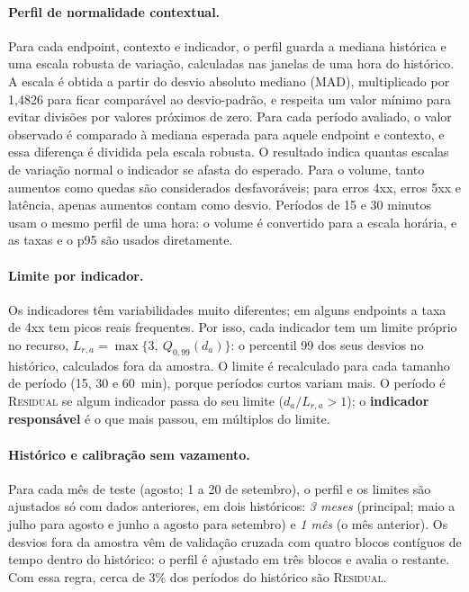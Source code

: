 \documentclass[sigconf,nonacm]{acmart}
\newcommand{\Residual}{\textsc{Residual}\xspace}
\begin{document}
\paragraph{Perfil de normalidade contextual.} Para cada endpoint, contexto e indicador, o perfil guarda a mediana histórica e uma escala robusta de variação, calculadas nas janelas de uma hora do histórico. A escala é obtida a partir do desvio absoluto mediano (MAD), multiplicado por 1,4826 para ficar comparável ao desvio-padrão, e respeita um valor mínimo para evitar divisões por valores próximos de zero. Para cada período avaliado, o valor observado é comparado à mediana esperada para aquele endpoint e contexto, e essa diferença é dividida pela escala robusta. O resultado indica quantas escalas de variação normal o indicador se afasta do esperado. Para o volume, tanto aumentos como quedas são considerados desfavoráveis; para erros 4xx, erros 5xx e latência, apenas aumentos contam como desvio. Períodos de 15 e 30 minutos usam o mesmo perfil de uma hora: o volume é convertido para a escala horária, e as taxas e o p95 são usados diretamente.

\paragraph{Limite por indicador.} Os indicadores têm variabilidades muito diferentes; em alguns endpoints a taxa de 4xx tem picos reais frequentes. Por isso, cada indicador tem um limite próprio no recurso, $L_{r,a}=\max\{3,\ Q_{0{,}99}(d_a)\}$: o percentil 99 dos seus desvios no histórico, calculados fora da amostra. O limite é recalculado para cada tamanho de período (15, 30 e 60~min), porque períodos curtos variam mais. O período é \Residual se algum indicador passa do seu limite ($d_a/L_{r,a}>1$); o \textbf{indicador responsável} é o que mais passou, em múltiplos do limite.

\paragraph{Histórico e calibração sem vazamento.} Para cada mês de teste (agosto; 1 a 20 de setembro), o perfil e os limites são ajustados só com dados anteriores, em dois históricos: \emph{3 meses} (principal; maio a julho para agosto e junho a agosto para setembro) e \emph{1 mês} (o mês anterior). Os desvios fora da amostra vêm de validação cruzada com quatro blocos contíguos de tempo dentro do histórico: o perfil é ajustado em três blocos e avalia o restante. Com essa regra, cerca de 3\% dos períodos do histórico são \Residual.
\end{document}
